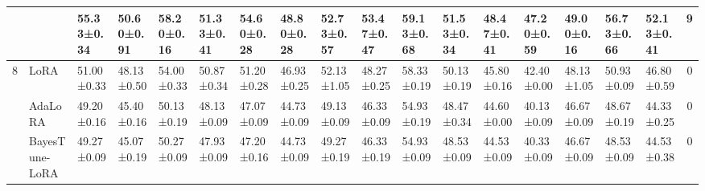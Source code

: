 \begin{table*}[t]
\begin{scriptsize}
{\begin{tabular}{c|l|l|l|l|l|l|l|l|l|l|l|l|l|l|l|l|c}
                    & \method{}                                 & \textbf{55.33±0.34}              & 50.60±0.91                        & \textbf{58.20±0.16}               & 51.33±0.41                       & 54.60±0.28                        & \textbf{48.80±0.28}               & 52.73±0.57                       & \textbf{53.47±0.47}              & 59.13±0.68                       & 51.53±0.34                       & \textbf{48.47±0.41}              & \textbf{47.20±0.59}               & \textbf{49.00±0.16}               & \textbf{56.73±0.66}              & \textbf{52.13±0.41}              & \textbf{9}    \\ \hline
\multirow{5}{*}{8}  & LoRA                                   & 51.00±0.33                        & 48.13±0.50                       & 54.00±0.33                        & 50.87±0.34                       & 51.20±0.28                        & 46.93±0.25                       & 52.13±1.05                       & 48.27±0.25                       & 58.33±0.19                       & 50.13±0.19                       & 45.80±0.16                        & 42.40±0.00                        & 48.13±1.05                       & 50.93±0.09                       & 46.80±0.59                        & 0             \\ %
                    & AdaLoRA                              & 49.20±0.16                        & 45.40±0.16                        & 50.13±0.19                       & 48.13±0.09                       & 47.07±0.09                       & 44.73±0.09                       & 49.13±0.09                       & 46.33±0.09                       & 54.93±0.19                       & 48.47±0.34                       & 44.60±0.00                        & 40.13±0.09                       & 46.67±0.09                       & 48.67±0.19                       & 44.33±0.25                       & 0             \\ %
                    & BayesTune-LoRA                            & 49.27±0.09                       & 45.07±0.19                       & 50.27±0.09                       & 47.93±0.09                       & 47.20±0.16                        & 44.73±0.09                       & 49.27±0.19                       & 46.33±0.19                       & 54.93±0.09                       & 48.53±0.09                       & 44.53±0.09                       & 40.33±0.09                       & 46.67±0.09                       & 48.53±0.09                       & 44.53±0.38                       & 0             \\ %

\end{tabular}}
\end{scriptsize}
\end{table*}
